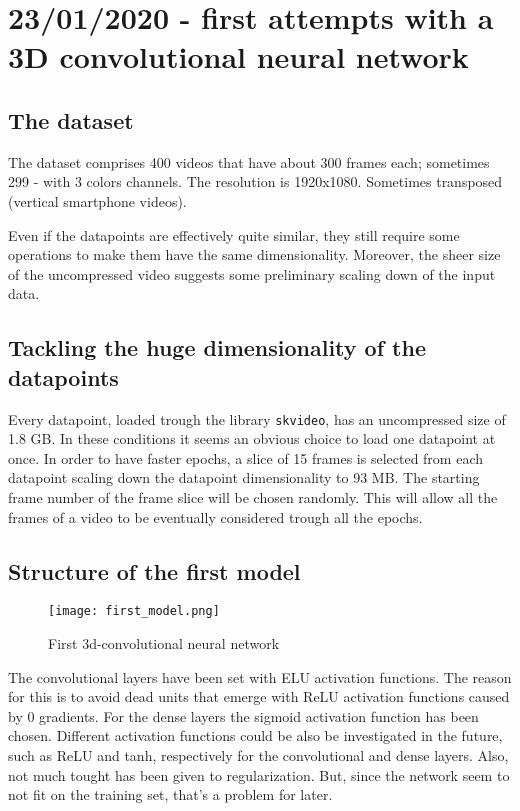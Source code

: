 
\section{23/01/2020 - first attempts with a 3D convolutional neural network}

\subsection{The dataset}
The dataset comprises 400 videos that have about 300 frames each; sometimes
299 - with 3 colors channels.
The resolution is 1920x1080. Sometimes transposed (vertical smartphone videos).

Even if the datapoints are effectively quite similar, they still require some operations
to make them have the same dimensionality. Moreover, the sheer size of the uncompressed
video suggests some preliminary scaling down of the input data.

\subsection{Tackling the huge dimensionality of the datapoints}

Every datapoint, loaded trough the library \texttt{skvideo}, has an uncompressed
size of 1.8 GB. In these conditions it seems an obvious choice to load one datapoint at once.
In order to have faster epochs, a slice of 15 frames is selected from each datapoint
scaling down the datapoint dimensionality to 93 MB.
The starting frame number of the frame slice will be chosen randomly. This will allow
all the frames of a video to be eventually considered trough all the epochs.

\subsection{Structure of the first model}

\begin{figure}[h]
\caption{First 3d-convolutional neural network}
\centering
\texttt{[image: first\_model.png]}
\end{figure}

The convolutional layers have been set with ELU activation functions.
The reason for this is to avoid dead units that emerge with ReLU activation functions
caused by 0 gradients.
For the dense layers the sigmoid activation function has been chosen.
Different activation functions could be also be investigated in the future,
such as ReLU and tanh, respectively for the convolutional and dense layers.
Also, not much tought has been given to regularization. But, since the network
seem to not fit on the training set, that's a problem for later.

